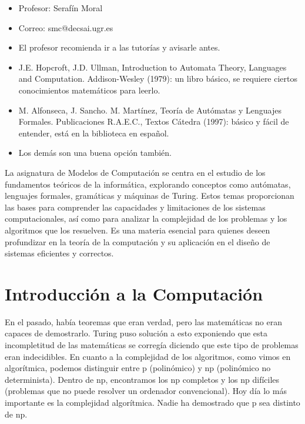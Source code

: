 \documentclass[12pt]{report} %
\providecommand{\tightlist}{%
  \setlength{\itemsep}{0pt}\setlength{\parskip}{0pt}}
\begin{document}
\begin{itemize}
\tightlist
\item
  Profesor: Serafín Moral\\
\item
  Correo: smc@decsai.ugr.es\\
\item
  El profesor recomienda ir a las tutorías y avisarle antes.\\
\item
  J.E. Hopcroft, J.D. Ullman, Introduction to Automata Theory, Languages
  and Computation. Addison-Wesley (1979): un libro básico, se requiere
  ciertos conocimientos matemáticos para leerlo.\\
\item
  M. Alfonseca, J. Sancho. M. Martínez, Teoría de Autómatas y Lenguajes
  Formales. Publicaciones R.A.E.C., Textos Cátedra (1997): básico y
  fácil de entender, está en la biblioteca en español.\\
\item
  Los demás son una buena opción también.
\end{itemize}

La asignatura de Modelos de Computación se centra en el estudio de los
fundamentos teóricos de la informática, explorando conceptos como
autómatas, lenguajes formales, gramáticas y máquinas de Turing. Estos
temas proporcionan las bases para comprender las capacidades y
limitaciones de los sistemas computacionales, así como para analizar la
complejidad de los problemas y los algoritmos que los resuelven. Es una
materia esencial para quienes deseen profundizar en la teoría de la
computación y su aplicación en el diseño de sistemas eficientes y
correctos.

\hypertarget{introducciuxf3n-a-la-computaciuxf3n}{%
\chapter{Introducción a la
Computación}\label{introducciuxf3n-a-la-computaciuxf3n}}

En el pasado, había teoremas que eran verdad, pero las matemáticas no
eran capaces de demostrarlo. Turing puso solución a esto exponiendo que
esta incompletitud de las matemáticas se corregía diciendo que este tipo
de problemas eran indecidibles. En cuanto a la complejidad de los
algoritmos, como vimos en algorítmica, podemos distinguir entre p
(polinómico) y np (polinómico no determinista). Dentro de np,
encontramos los np completos y los np difíciles (problemas que no puede
resolver un ordenador convencional). Hoy día lo más importante es la
complejidad algorítmica. Nadie ha demostrado que p sea distinto de np.
\end{document}
